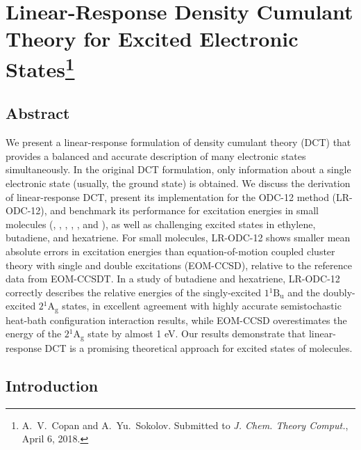 \chapter[%
    Linear-Response Density Cumulant Theory for Excited Electronic States
]{%
    Linear-Response Density Cumulant Theory for Excited Electronic
    States\footnote{%
        A.~V.~Copan and A.~Yu.~Sokolov.
        Submitted to {\itshape J. Chem. Theory Comput.}, April 6, 2018.
    }
}
\label{ch:response}

\newpage
\section{Abstract}

We present a linear-response formulation of density cumulant theory (DCT) that
provides a balanced and accurate description of many electronic states
simultaneously.
In the original DCT formulation, only information about a single electronic
state (usually, the ground state) is obtained.
We discuss the derivation of linear-response DCT, present its implementation for
the ODC-12 method (LR-ODC-12), and benchmark its performance for excitation
energies in small molecules (, , , , ,
and ), as well as challenging excited states in ethylene, butadiene,
and hexatriene. 
For small molecules, LR-ODC-12 shows smaller mean absolute errors in excitation energies than equation-of-motion coupled cluster
theory with single and double excitations (EOM-CCSD), relative to the reference
data from EOM-CCSDT\@.
In a study of butadiene and hexatriene, LR-ODC-12 correctly describes the
relative energies of the singly-excited $1{}^1\mathrm{B_{u}}$ and the
doubly-excited $2{}^1\mathrm{A_{g}}$ states, in excellent agreement with
highly accurate semistochastic heat-bath configuration interaction results,
while EOM-CCSD overestimates the energy of the $2{}^1\mathrm{A_{g}}$ state by
almost 1 eV.
Our results demonstrate that linear-response DCT is a promising theoretical approach for excited states of molecules. 


\section{Introduction}

